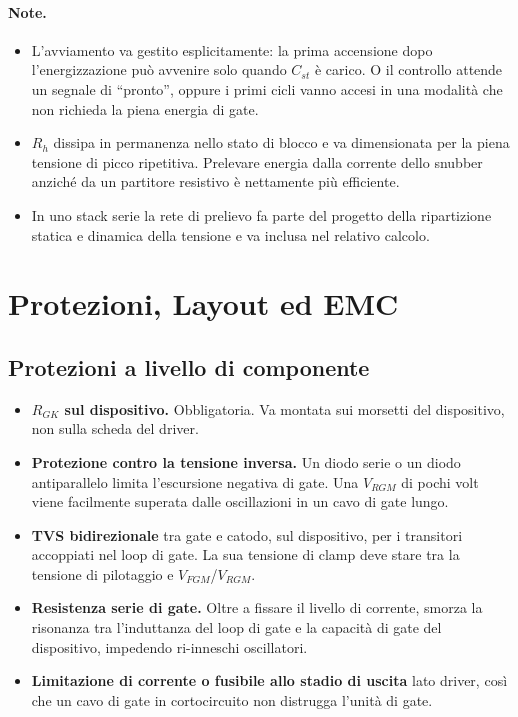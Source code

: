 \documentclass[11pt,a4paper]{article}
\begin{document}
\paragraph{Note.}
\begin{itemize}
  \item L'avviamento va gestito esplicitamente: la prima accensione dopo
        l'energizzazione può avvenire solo quando $C_{st}$ è carico. O il controllo
        attende un segnale di ``pronto'', oppure i primi cicli vanno accesi in una
        modalità che non richieda la piena energia di gate.
  \item $R_h$ dissipa in permanenza nello stato di blocco e va dimensionata per la
        piena tensione di picco ripetitiva. Prelevare energia dalla corrente dello
        snubber anziché da un partitore resistivo è nettamente più efficiente.
  \item In uno stack serie la rete di prelievo fa parte del progetto della
        ripartizione statica e dinamica della tensione e va inclusa nel relativo
        calcolo.
\end{itemize}

\section{Protezioni, Layout ed EMC}

\subsection{Protezioni a livello di componente}

\begin{itemize}
  \item \textbf{$R_{GK}$ sul dispositivo.} Obbligatoria. Va montata sui morsetti del
        dispositivo, non sulla scheda del driver.
  \item \textbf{Protezione contro la tensione inversa.} Un diodo serie o un diodo
        antiparallelo limita l'escursione negativa di gate. Una $V_{RGM}$ di pochi
        volt viene facilmente superata dalle oscillazioni in un cavo di gate lungo.
  \item \textbf{TVS bidirezionale} tra gate e catodo, sul dispositivo, per i
        transitori accoppiati nel loop di gate. La sua tensione di clamp deve stare
        tra la tensione di pilotaggio e $V_{FGM}$/$V_{RGM}$.
  \item \textbf{Resistenza serie di gate.} Oltre a fissare il livello di corrente,
        smorza la risonanza tra l'induttanza del loop di gate e la capacità di gate
        del dispositivo, impedendo ri-inneschi oscillatori.
  \item \textbf{Limitazione di corrente o fusibile allo stadio di uscita} lato
        driver, così che un cavo di gate in cortocircuito non distrugga l'unità di
        gate.
\end{itemize}
\end{document}

